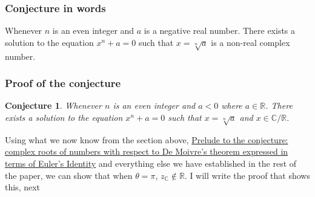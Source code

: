 \documentclass{article}
\newtheorem*{conjecture*}{Conjecture}
\begin{document}
\subsubsection{Conjecture in words} 

Whenever \(n\) is an even integer and \(a\) is a negative real number. There exists a solution to the equation \(x^n + a = 0\) such that \(x = \sqrt[n]{a}\) is a non-real complex number. 

\subsubsection{Proof of the conjecture}

\begin{conjecture*}
    Whenever \(n\) is an even integer and \(a < 0\) where \(a \in \mathds{R}\). There exists a solution to the equation \(x^n + a = 0\) such that \(x = \sqrt[n]{a}\) and \(x \in \mathds{C}/\mathds{R}\). 
\end{conjecture*}

Using what we now know from the section above, \hyperlink{Prelude}{Prelude to the conjecture: complex roots of numbers with respect to De Moivre's theorem expressed in terms of Euler's Identity} and everything else we have established in the rest of the paper, we can show that when \(\theta = \pi\), \(z_{\mathds{C}} \notin \mathds{R}\). I will write the proof that shows this, next 
\end{document}
